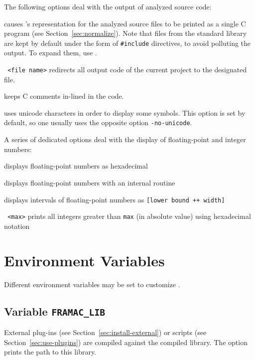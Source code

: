 The following options deal with the output of analyzed source code:
\begin{description}
\item {} causes \FramaC's representation for the analyzed
  source files to be printed as a single C program (see
  Section~\ref{sec:normalize}). Note that files from the \FramaC standard
  library are kept by default under the form of \texttt{\#include} directives,
  to avoid polluting the output. To expand them, use .
\item \texttt{ <file name>} redirects all output code of the
  current project to the designated file.
\item {} keeps C comments in-lined in the code.
\item {} uses unicode characters in order to display some
  \acsl symbols. This option is set by default, so one usually uses the opposite
  option \texttt{-no-unicode}.
\end{description}
A series of dedicated options deal with the display of floating-point and
integer numbers:
\begin{description}
\item {} displays floating-point
  numbers as hexadecimal
\item {} displays floating-point numbers
  with an internal routine
\item {} displays intervals of
  floating-point numbers as \texttt{[lower bound ++ width]}
\item \texttt{ <max>} prints all integers greater
  than \texttt{max} (in absolute value) using hexadecimal notation
\end{description}

\section{Environment Variables}\label{sec:env-variables}

Different environment variables may be set to customize \FramaC.

\subsection{Variable \texttt{FRAMAC\_LIB}}\label{sec:var-lib}

External plug-ins (see Section~\ref{sec:install-external}) or scripts (see
Section~\ref{sec:use-plugins}) are compiled against the \FramaC compiled
library. The \FramaC option  prints the path to
this library.


